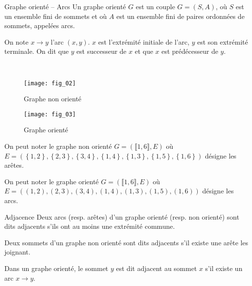 \begin{defi}{Graphe orienté -- Arcs}\cite{ref_01}
Un graphe orienté $G$ est un couple $G=(S,A)$, où $S$ est un ensemble fini de sommets et où $A$ est un ensemble fini de paires ordonnées de sommets, appelées arcs.

On note $x\to y$ l'arc $(x,y)$. $x$ est l'extrémité initiale de l'arc, $y$ est son extrémité terminale. On dit que $y$ est successeur de $x$ et que $x$ est prédécesseur de $y$. 
\end{defi}

\begin{exemple}~\\

\begin{multicols}{2}
\begin{figure}[H]
\texttt{[image: fig\_02]}
\captionsetup{justification=centering}
\caption{Graphe non orienté \label{fig_02}}
\end{figure}


\begin{figure}[H]
\texttt{[image: fig\_03]}
\captionsetup{justification=centering}
\caption{Graphe orienté}
\end{figure}
\end{multicols}

\end{exemple}

\begin{rem}
On peut noter le graphe non orienté $G=\left(\llbracket 1,6\rrbracket,E\right)$ où $E=\left(
\left\{1,2\right\},\left\{2,3\right\},\left\{3,4\right\},\left\{1,4\right\},\left\{1,3\right\},\left\{1,5\right\},\left\{1,6\right\}\right)$ désigne les arêtes. 

On peut noter le graphe orienté $G=\left(\llbracket 1,6\rrbracket,E\right)$ où $E=\left(
\left(1,2\right),\left(2,3\right),\left(3,4\right),\left(1,4\right),\left(1,3\right),\left(1,5\right),\left(1,6\right)\right)$ désigne les arcs. 
\end{rem}

\begin{defi}{Adjacence}
Deux arcs (resp. arêtes) d'un graphe orienté (resp. non orienté) sont dits adjacents s'ils ont au moins une extrémité commune. 

Deux sommets d'un graphe non orienté sont dits adjacents s'il existe une arête les joignant. 

Dans un graphe orienté, le sommet $y$ est dit adjacent au sommet $x$ s'il existe un arc $x\to y$.
\end{defi}


